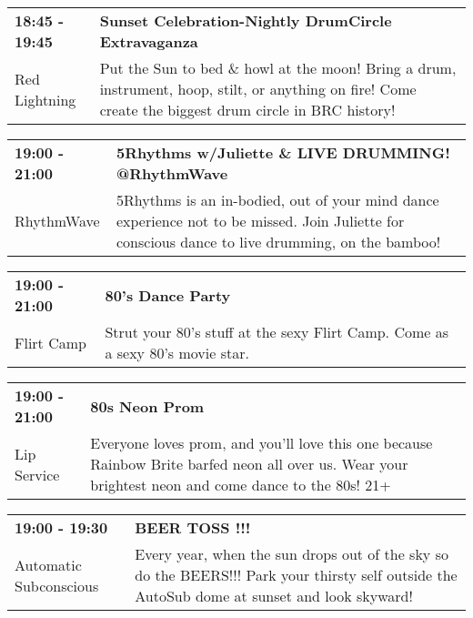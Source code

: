 \begin{tabular}{ p{1in} p{2.2in} }
    \textbf{18:45 - 19:45} & \textbf{Sunset Celebration-Nightly DrumCircle Extravaganza} \\
    Red Lightning \newline  & Put the Sun to bed \& howl at the moon! Bring a drum, instrument, hoop, stilt, or anything on fire! Come create the biggest drum circle in BRC history! \\
    \hline 
\end{tabular}
    
\begin{tabular}{ p{1in} p{2.2in} }
    \textbf{19:00 - 21:00} & \textbf{5Rhythms w/Juliette \& LIVE DRUMMING!  @RhythmWave} \\
    RhythmWave \newline  & 5Rhythms is an in-bodied, out of your mind dance experience not to be missed. Join Juliette for conscious dance to live drumming, on the bamboo! \\
    \hline 
\end{tabular}
    
\begin{tabular}{ p{1in} p{2.2in} }
    \textbf{19:00 - 21:00} & \textbf{80's Dance Party} \\
    Flirt Camp \newline  & Strut your 80's stuff at the sexy Flirt Camp. Come as a sexy 80's movie star. \\
    \hline 
\end{tabular}
    
\begin{tabular}{ p{1in} p{2.2in} }
    \textbf{19:00 - 21:00} & \textbf{80s Neon Prom} \\
    Lip Service \newline  & Everyone loves prom, and you'll love this one because Rainbow Brite barfed neon all over us. Wear your brightest neon and come dance to the 80s! 21+ \\
    \hline 
\end{tabular}
    
\begin{tabular}{ p{1in} p{2.2in} }
    \textbf{19:00 - 19:30} & \textbf{BEER TOSS !!!} \\
    Automatic Subconscious \newline  & Every year, when the sun drops out of the sky so do the BEERS!!! Park your thirsty self outside the AutoSub dome at sunset and look skyward! \\
    \hline 
\end{tabular}
    
